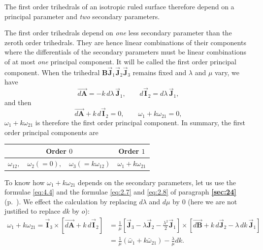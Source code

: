 \documentclass[leqno,11pt]{book}
\numberwithin{equation}{chapter}
\theoremstyle{shape1}
\theoremstyle{shapesmall}
\newcommand{\fsref}[1]{{\rm\textsection\textbf{\ref{sec:#1}}}}
\newcommand{\rvec}[1]{\vec{\mathbf{#1}}}
\newcommand{\ivec}{\rvec{I}}
\newcommand{\jvec}{\rvec{J}}
\begin{document}
The first order trihedrals of an isotropic ruled surface therefore depend on a principal parameter and \emph{two} secondary parameters.

The first order trihedrals depend on \emph{one} less secondary parameter than the zeroth order trihedrals. They are hence linear combinations of their components where the differentials of the secondary parameters must be linear combinations of at most \emph{one} principal component. It will be called the first order principal component. When the trihedral $\mathbf{B}\jvec_{1}\jvec_{2}\jvec_{3}$ remains fixed and $\lambda$ and $\mu$ vary, we have
\[
\overrightarrow{d\mathbf{A}}=-k\,d\lambda\,\jvec_{1},\qquad d\ivec_{2}=d\lambda\,\jvec_{1},
\]
and then
\[
\overrightarrow{d\mathbf{A}}+k\,d\ivec_{2}=0,\qquad\omega_{1}+k\omega_{21}=0,
\]
$\omega_{1}+k\omega_{21}$ is therefore the first order principal component. In summary, the first order principal components are  
\begin{center}  
\begin{tabular}{|c|c|}
  \hline
  Order $0$&Order $1$\\
  \hline
  $\omega_{12},\quad\omega_{2}(=0),\quad\omega_{3}(=k\omega_{12})$&$\omega_{1}+k\omega_{21}$\\
  \hline
\end{tabular}
\end{center}

To know how $\omega_{1}+k\omega_{21}$ depends on the secondary parameters, let us use the formulae \eqref{eq:4.4} and the formulae \eqref{eq:2.7} and \eqref{eq:2.8} of paragraph \fsref{24} (p.~\pageref{eq:2.7}). We effect the calculation by replacing $d\lambda$ and $d\mu$ by $0$ (here we are not justified to replace $dk$ by $o$):
\begin{align*}
  \omega_{1}+k\omega_{21}=\ivec_{3}\times[\overrightarrow{d\mathbf{A}}+k\,d\ivec_{2}]&=\frac{1}{\mu}\left[\jvec_{3}-\lambda\jvec_{2}-\frac{\lambda^{2}}{2}\jvec_{1}\right]\times[\overrightarrow{d\mathbf{B}}+k\,d\jvec_{2}-\lambda\,dk\,\jvec_{1}]\\
  &=\frac{1}{\mu}(\bar\omega_{1}+k\bar\omega_{21})-\frac{\lambda}{\mu}dk.
\end{align*}
\end{document}
